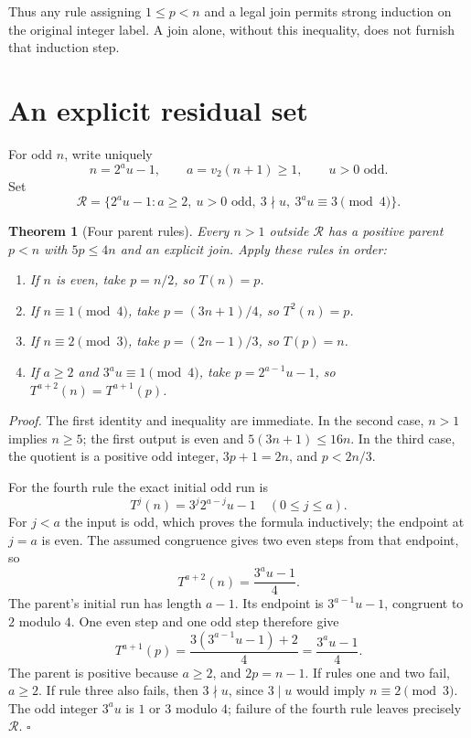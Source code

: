\documentclass[11pt,letterpaper]{article}
\newtheorem{theorem}{Theorem}
\newenvironment{proof}{\noindent\textit{Proof.}}{\hfill\(\square\)}
\begin{document}
Thus any rule assigning \(1\le p<n\) and a legal join permits strong
induction on the original integer label. A join alone, without this
inequality, does not furnish that induction step.

\section{An explicit residual set}

For odd \(n\), write uniquely
\[
n=2^a u-1,\qquad a=v_2(n+1)\ge1,\qquad u>0\text{ odd}.
\]
Set
\[
\mathcal R=\{2^a u-1:a\ge2,\ u>0\text{ odd},\ 3\nmid u,
                         \ 3^a u\equiv3\pmod4\}.
\]

\begin{theorem}[Four parent rules]
Every \(n>1\) outside \(\mathcal R\) has a positive parent \(p<n\) with
\(5p\le4n\) and an explicit join. Apply these rules in order:
\begin{enumerate}[label=\arabic*.]
\item If \(n\) is even, take \(p=n/2\), so \(T(n)=p\).
\item If \(n\equiv1\pmod4\), take \(p=(3n+1)/4\), so \(T^2(n)=p\).
\item If \(n\equiv2\pmod3\), take \(p=(2n-1)/3\), so \(T(p)=n\).
\item If \(a\ge2\) and \(3^a u\equiv1\pmod4\), take
\(p=2^{a-1}u-1\), so \(T^{a+2}(n)=T^{a+1}(p)\).
\end{enumerate}
\end{theorem}
\begin{proof}
The first identity and inequality are immediate. In the second case,
\(n>1\) implies \(n\ge5\); the first output is even and
\(5(3n+1)\le16n\). In the third case, the quotient is a positive odd
integer, \(3p+1=2n\), and \(p<2n/3\).

For the fourth rule the exact initial odd run is
\[
T^j(n)=3^j2^{a-j}u-1\quad(0\le j\le a).
\]
For \(j<a\) the input is odd, which proves the formula inductively;
the endpoint at \(j=a\) is even. The assumed congruence gives two even
steps from that endpoint, so
\[
T^{a+2}(n)=\frac{3^a u-1}{4}.
\]
The parent's initial run has length \(a-1\). Its endpoint is
\(3^{a-1}u-1\), congruent to \(2\) modulo \(4\). One even step and one
odd step therefore give
\[
T^{a+1}(p)=\frac{3(3^{a-1}u-1)+2}{4}
          =\frac{3^a u-1}{4}.
\]
The parent is positive because \(a\ge2\), and \(2p=n-1\).
If rules one and two fail, \(a\ge2\). If rule three also fails, then
\(3\nmid u\), since \(3\mid u\) would imply \(n\equiv2\pmod3\).
The odd integer \(3^a u\) is \(1\) or \(3\) modulo \(4\); failure of the
fourth rule leaves precisely \(\mathcal R\).
\end{proof}
\end{document}
